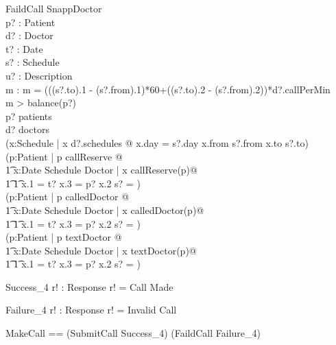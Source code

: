 \documentclass{article}
\begin{document}
\begin{schema}{FaildCall}
\Xi SnappDoctor\\
p? : Patient\\
d? : Doctor\\
t? : Date\\
s? : Schedule\\
u? : Description\\
m : \nat
\where
m = (((s?.to).1 - (s?.from).1)*60+((s?.to).2 - (s?.from).2))*d?.callPerMin \\
m > balance(p?) \lor \\
p? \notin patients \lor \\
d? \notin doctors \lor \\
\neg (\exists x:Schedule | x \in d?.schedules @ x.day = s?.day \land x.from \le s?.from \land x.to \ge s?.to) \lor\\
\neg (\forall p:Patient | p \in callReserve @ \\
\t1 \forall x:Date \cross Schedule \cross Doctor | x \in callReserve(p)@\\
\t1 \t1 x.1 = t? \land x.3 = p? \implies x.2 \cap s? = \emptyset) \lor \\
\neg(\forall p:Patient | p \in calledDoctor @ \\
\t1 \forall x:Date \cross Schedule \cross Doctor | x \in calledDoctor(p)@\\
\t1 \t1 x.1 = t? \land x.3 = p? \implies x.2 \cap s? = \emptyset)\lor\\
\neg(\forall p:Patient | p \in textDoctor @ \\
\t1 \forall x:Date \cross Schedule \cross Doctor | x \in textDoctor(p)@\\
\t1 \t1 x.1 = t? \land x.3 = p? \implies x.2 \cap s? = \emptyset)
\end{schema}

\begin{schema}{Success_4}
r! : Response
\where
r! = Call Made
\end{schema}

\begin{schema}{Failure_4}
r! : Response
\where
r! = Invalid Call
\end{schema}

\begin{zed}
MakeCall == (SubmitCall \land Success_4) \lor (FaildCall \land Failure_4)
\end{zed}
\end{document}
